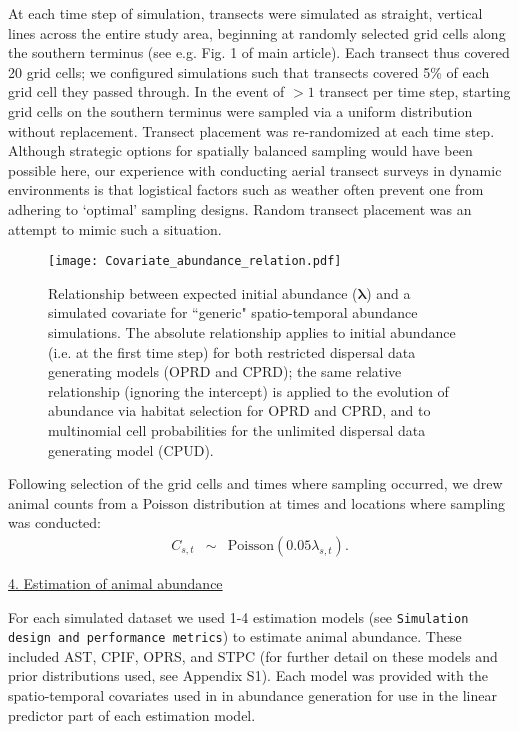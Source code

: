 \documentclass[12pt,fleqn]{article}
\begin{document}
\begin{flushleft}
At each time step of simulation, transects were simulated as straight, vertical lines across the entire study area, beginning at randomly selected grid cells along the southern terminus (see e.g. Fig. 1 of main article).  Each transect thus covered 20 grid cells; we configured simulations such that transects covered 5\% of each grid cell they passed through.  In the event of $>1$ transect per time step, starting grid cells on the southern terminus were sampled via a uniform distribution without replacement.  Transect placement was re-randomized at each time step.  Although strategic options for spatially balanced sampling would have been possible here, our experience with conducting aerial transect surveys in dynamic environments is that logistical factors such as weather often prevent one from adhering to `optimal' sampling designs.  Random transect placement was an attempt to mimic such a situation.

\begin{figure*}
\begin{center}
\texttt{[image: Covariate\_abundance\_relation.pdf]}
\caption{Relationship between expected initial abundance ($\boldsymbol{\lambda}$) and a simulated covariate for ``generic" spatio-temporal abundance simulations.  The absolute relationship applies to initial abundance (i.e. at the first time step) for both restricted dispersal data generating models (OPRD and CPRD); the same relative relationship (ignoring the intercept) is applied to the evolution of abundance via habitat selection for OPRD and CPRD, and to multinomial cell probabilities for the unlimited dispersal data generating model (CPUD).} \label{fig:cov-relation}
\end{center}
\end{figure*}

Following selection of the grid cells and times where sampling occurred, we drew animal counts from a Poisson distribution at times and locations where sampling was conducted:
\begin{eqnarray*}
  C_{s,t} & \sim & \text{Poisson}(0.05 \lambda_{s,t}).
\end{eqnarray*}

\underline{4. Estimation of animal abundance}

For each simulated dataset we used 1-4 estimation models (see \texttt{Simulation design and performance metrics}) to estimate animal abundance.  These included AST, CPIF, OPRS, and STPC (for further detail on these models and prior distributions used, see Appendix S1).  Each model was provided with the spatio-temporal covariates used in in abundance generation for use in the linear predictor part of each estimation model.


\end{flushleft}
\end{document}
